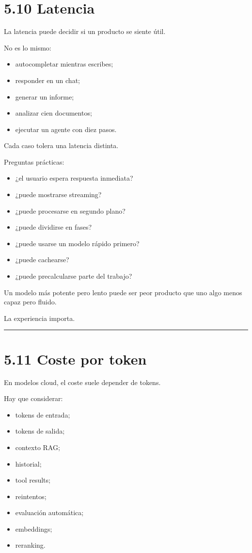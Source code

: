 \section{5.10 Latencia}\label{latencia-3}

La latencia puede decidir si un producto se siente útil.

No es lo mismo:

\begin{itemize}
\tightlist
\item
  autocompletar mientras escribes;
\item
  responder en un chat;
\item
  generar un informe;
\item
  analizar cien documentos;
\item
  ejecutar un agente con diez pasos.
\end{itemize}

Cada caso tolera una latencia distinta.

Preguntas prácticas:

\begin{itemize}
\tightlist
\item
  ¿el usuario espera respuesta inmediata?
\item
  ¿puede mostrarse streaming?
\item
  ¿puede procesarse en segundo plano?
\item
  ¿puede dividirse en fases?
\item
  ¿puede usarse un modelo rápido primero?
\item
  ¿puede cachearse?
\item
  ¿puede precalcularse parte del trabajo?
\end{itemize}

Un modelo más potente pero lento puede ser peor producto que uno algo
menos capaz pero fluido.

La experiencia importa.

\begin{center}\rule{0.5\linewidth}{0.5pt}\end{center}

\section{5.11 Coste por token}\label{coste-por-token}

En modelos cloud, el coste suele depender de tokens.

Hay que considerar:

\begin{itemize}
\tightlist
\item
  tokens de entrada;
\item
  tokens de salida;
\item
  contexto RAG;
\item
  historial;
\item
  tool results;
\item
  reintentos;
\item
  evaluación automática;
\item
  embeddings;
\item
  reranking.
\end{itemize}

